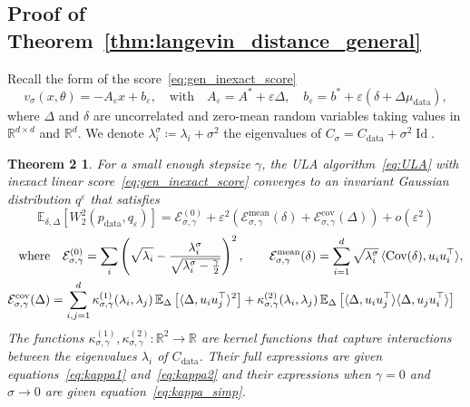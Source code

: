 \documentclass[11pt]{article}
\newcommand{\eqdef}{\coloneqq}
\newcommand{\id}{\operatorname{Id}}
\newcommand{\EE}{\mathbb{E}}
\newcommand{\cov}{\operatorname{Cov}}
\begin{document}
\subsection{Proof of Theorem~\ref{thm:langevin_distance_general}} \label{app:langevin_distance_general}
Recall the form of the score~\eqref{eq:gen_inexact_score}
\begin{equation*}
    v_\sigma(x, \theta) = - A_\varepsilon x + b_\varepsilon, \quad \text{with}\quad 
    A_\varepsilon = A^* + \varepsilon \Delta, \quad b_\varepsilon = b^* + \varepsilon (\delta + \Delta \mu_\mathrm{data}),
\end{equation*}
where \(\Delta\) and \(\delta\) are uncorrelated and zero-mean random variables taking values in $\mathbb{R}^{d \times d}$ and $\mathbb{R}^{d}$.
We denote $\lambda^\sigma_i \eqdef \lambda_i + \sigma^2$ the eigenvalues of $C_\sigma = C_{\mathrm{data}} + \sigma^2 \id$. 
\newtheorem*{repeatthm2}{Theorem 2}
\begin{repeatthm2}
For a small enough stepsize $\gamma$, the ULA algorithm~\eqref{eq:ULA} with inexact linear score~\eqref{eq:gen_inexact_score} converges to an invariant Gaussian distribution $q^\varepsilon$ that satisfies 
\begin{equation*} 
\EE_{\delta, \Delta}  \left[ W_2^2(p_\mathrm{data},q_\varepsilon) \right] =  \mathcal{E}^{(0)}_{\sigma, \gamma} + \varepsilon^2 \left( \mathcal{E}_{\sigma, \gamma}^{\text{mean}}(\delta) + \mathcal{E}_{\sigma, \gamma}^{\text{cov}}(\Delta) \right) + o(\varepsilon^2)
\end{equation*}
\begin{equation*} 
\begin{split}
\text{where} &\quad 
\mathcal{E}^{(0)}_{\sigma, \gamma} = \sum_i \left(\sqrt{\lambda_i} - \frac{\lambda_i^\sigma}{\sqrt{\lambda_i^\sigma - \frac{\gamma}{2}}}\right)^2, \qquad
\mathcal{E}_{\sigma, \gamma}^{\text{mean}}(\delta) = \sum_{i=1}^d \sqrt{\lambda^\sigma_i } \, \langle \cov(\delta), u_i u_i^\top \rangle,  \\ \vspace{-0.2cm}
\mathcal{E}_{\sigma, \gamma}^{\text{cov}}(\Delta) &= \sum_{i,j=1}^d \kappa^{(1)}_{\sigma, \gamma}(\lambda_i, \lambda_j) \, \EE_{\Delta}\left[\langle \Delta, u_iu_j^\top \rangle^2\right] + \kappa^{(2)}_{\sigma, \gamma}(\lambda_i, \lambda_j) \, \EE_{\Delta}\left[\langle \Delta, u_iu_j^\top \rangle \langle \Delta, u_ju_i^\top \rangle \right] 
\end{split}
\end{equation*}
The functions \( \kappa^{(1)}_{\sigma, \gamma}, \kappa^{(2)}_{\sigma, \gamma} : \mathbb{R}^2 \to \mathbb{R} \) are kernel functions that capture interactions between the eigenvalues \( \lambda_i \) of \( C_\mathrm{data} \). Their full expressions are given equations~\eqref{eq:kappa1} and~\eqref{eq:kappa2} and their expressions when $\gamma = 0$ and $\sigma \to 0$ are given equation~\eqref{eq:kappa_simp}.
\end{repeatthm2}
\end{document}
